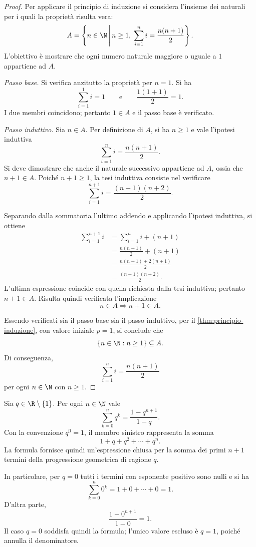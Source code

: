 \begin{proof}
Per applicare il principio di induzione si considera l'insieme dei naturali
per i quali la proprietà risulta vera:
\[
  A=\left\{n\in\N\,\middle|\,n\ge1,\;
    \sum_{i=1}^{n}i=\frac{n(n+1)}2\right\}.
\]
L'obiettivo è mostrare che ogni numero naturale maggiore o uguale a \(1\)
appartiene ad \(A\).

\emph{Passo base.}
Si verifica anzitutto la proprietà per \(n=1\). Si ha
\[
  \sum_{i=1}^{1}i=1
  \qquad\text{e}\qquad
  \frac{1(1+1)}2=1.
\]
I due membri coincidono; pertanto \(1\in A\) e il passo base è verificato.

\emph{Passo induttivo.}
Sia \(n\in A\). Per definizione di \(A\), si ha \(n\ge1\) e vale
l'ipotesi induttiva
\[
  \sum_{i=1}^{n}i=\frac{n(n+1)}2.
\]
Si deve dimostrare che anche il naturale successivo appartiene ad \(A\),
ossia che \(n+1\in A\). Poiché \(n+1\ge1\), la tesi induttiva consiste
nel verificare
\[
  \sum_{i=1}^{n+1}i=\frac{(n+1)(n+2)}2.
\]

Separando dalla sommatoria l'ultimo addendo e applicando l'ipotesi
induttiva, si ottiene
\begin{align*}
  \sum_{i=1}^{n+1}i
    &=\sum_{i=1}^{n}i+(n+1)\\
    &=\frac{n(n+1)}2+(n+1)\\
    &=\frac{n(n+1)+2(n+1)}2\\
    &=\frac{(n+1)(n+2)}2.
\end{align*}
L'ultima espressione coincide con quella richiesta dalla tesi induttiva;
pertanto \(n+1\in A\). Risulta quindi verificata l'implicazione
\[
  n\in A\Longrightarrow n+1\in A.
\]

Essendo verificati sia il passo base sia il passo induttivo, per il
\cref{thm:principio-induzione}, con valore iniziale \(p=1\), si conclude che
\[
  \{n\in\N:n\ge1\}\subseteq A.
\]
Di conseguenza,
\[
  \sum_{i=1}^{n}i=\frac{n(n+1)}2
\]
per ogni \(n\in\N\) con \(n\ge1\).
\end{proof}

\begin{example}
\label{ex:somma-geometrica-finita}
Sia \(q\in\R\setminus\{1\}\). Per ogni \(n\in\N\) vale
\[
  \sum_{k=0}^{n}q^k=\frac{1-q^{n+1}}{1-q}.
\]
Con la convenzione \(q^0=1\), il membro sinistro rappresenta la somma
\[
  1+q+q^2+\cdots+q^n.
\]
La formula fornisce quindi un'espressione chiusa per la somma dei primi
\(n+1\) termini della progressione geometrica di ragione \(q\).

In particolare, per \(q=0\) tutti i termini con esponente positivo sono
nulli e si ha
\[
  \sum_{k=0}^{n}0^k
  =1+0+\cdots+0
  =1.
\]
D'altra parte,
\[
  \frac{1-0^{n+1}}{1-0}=1.
\]
Il caso \(q=0\) soddisfa quindi la formula; l'unico valore escluso è
\(q=1\), poiché annulla il denominatore.
\end{example}


